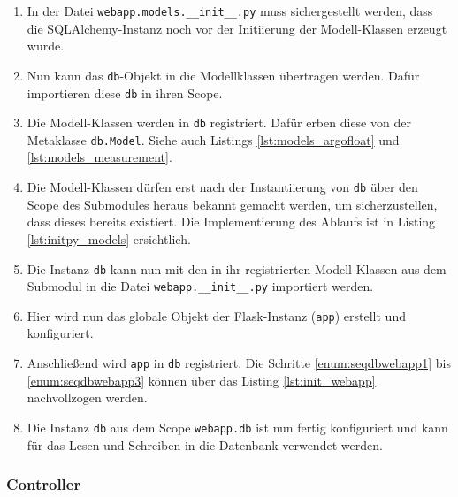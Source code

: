 \begin{enumerate}
 \item
        In der Datei \texttt{webapp.models.\_\_init\_\_.py} muss sichergestellt werden, dass die SQLAlchemy-Instanz noch vor der Initiierung der Modell-Klassen erzeugt wurde.
 \item
        Nun kann das \texttt{db}-Objekt in die Modellklassen übertragen werden. Dafür importieren diese \texttt{db} in ihren Scope.
 \item
        Die Modell-Klassen werden in \texttt{db} registriert. Dafür erben diese von der Metaklasse \texttt{db.Model}. Siehe auch Listings \ref{lst:models_argofloat} und \ref{lst:models_measurement}.



 \item
        Die Modell-Klassen dürfen erst nach der Instantiierung von \texttt{db} über den Scope des Submodules heraus bekannt gemacht werden, um sicherzustellen, dass dieses bereits existiert. Die Implementierung des Ablaufs ist in Listing \ref{lst:initpy_models} ersichtlich.

 \item  \label{enum:seqdbwebapp1}
        Die Instanz \texttt{db} kann nun mit den in ihr registrierten Modell-Klassen  aus dem Submodul in die Datei \texttt{webapp.\_\_init\_\_.py} importiert werden.

\item
        Hier wird nun das globale Objekt der Flask-Instanz (\texttt{app}) erstellt und konfiguriert.

\item   \label {enum:seqdbwebapp3}
        Anschließend wird \texttt{app} in \texttt{db} registriert. Die Schritte \ref{enum:seqdbwebapp1} bis \ref{enum:seqdbwebapp3} können über das Listing \ref{lst:init_webapp} nachvollzogen werden.

\item   Die Instanz \texttt{db} aus dem Scope
        \texttt{webapp.db} ist nun fertig konfiguriert und kann für das Lesen und Schreiben in die Datenbank verwendet werden.
\end{enumerate}


\pagebreak
\subsubsection{Controller}

